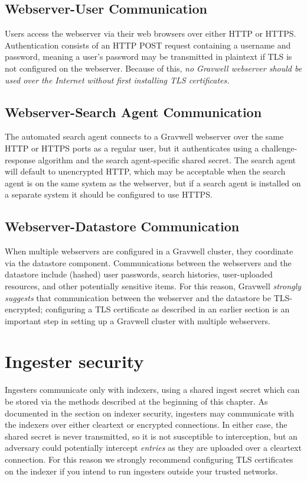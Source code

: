 \subsection{Webserver-User Communication}

Users access the webserver via their web browsers over either HTTP or
HTTPS. Authentication consists of an HTTP POST request containing a
username and password, meaning a user's password may be transmitted in
plaintext if TLS is not configured on the webserver. Because of this, \emph{no
Gravwell webserver should be used over the Internet without first
installing TLS certificates.}

\subsection{Webserver-Search Agent Communication}

The automated search agent connects to a Gravwell webserver over the
same HTTP or HTTPS ports as a regular user, but it authenticates using a
challenge-response algorithm and the search agent-specific shared
secret. The search agent will default to unencrypted HTTP, which may be
acceptable when the search agent is on the same system as the webserver,
but if a search agent is installed on a separate system it should be
configured to use HTTPS.

\subsection{Webserver-Datastore Communication}

When multiple webservers are configured in a Gravwell cluster, they
coordinate via the datastore component. Communications between the
webservers and the datastore include (hashed) user passwords, search
histories, user-uploaded resources, and other potentially sensitive
items. For this reason, Gravwell \emph{strongly suggests} that communication between
the webserver and the datastore be TLS-encrypted; configuring a TLS
certificate as described in an earlier section is an important step in
setting up a Gravwell cluster with multiple webservers.


\section{Ingester security}

Ingesters communicate only with indexers, using a shared ingest secret
which can be stored via the methods described at the beginning of this
chapter. As documented in the section on indexer security, ingesters may
communicate with the indexers over either cleartext or encrypted
connections. In either case, the shared secret is never transmitted, so
it is not susceptible to interception, but an adversary could
potentially intercept \emph{entries} as they are uploaded over a cleartext
connection. For this reason we strongly recommend configuring TLS
certificates on the indexer if you intend to run ingesters outside your
trusted networks.

